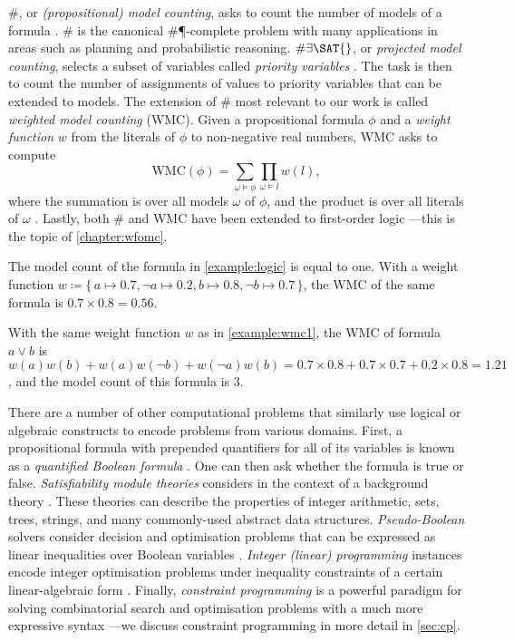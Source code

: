 \#\SAT{}, or \emph{(propositional) model counting}, asks to count the number of models of a formula \citep{DBLP:series/faia/GomesSS09}. \#\SAT{} is the canonical \#\P-complete problem with many applications in areas such as planning and probabilistic reasoning. $\#\exists\SAT{}$, or \emph{projected model counting}, selects a subset of variables called \emph{priority variables} \citep{DBLP:conf/sat/AzizCMS15}. The task is then to count the number of assignments of values to priority variables that can be extended to models. The extension of \#\SAT{} most relevant to our work is called \emph{weighted model counting} (WMC). Given a propositional formula $\phi$ and a \emph{weight function} $w$ from the literals of $\phi$ to non-negative real numbers, WMC asks to compute
\[
\mathrm{WMC}(\phi) = \sum_{\omega \models \phi} \prod_{\omega \models l} w(l),
\]
where the summation is over all models $\omega$ of $\phi$, and the product is over all literals of $\omega$ \citep{DBLP:journals/ai/ChaviraD08}. Lastly, both \#\SAT{} and WMC have been extended to first-order logic \citep{DBLP:conf/ijcai/BroeckTMDR11}---this is the topic of \cref{chapter:wfomc}.

\begin{example} \label{example:wmc1}
  The model count of the formula in \cref{example:logic} is equal to one. With a weight function $w \coloneqq \{\, a \mapsto 0.7, \neg a \mapsto 0.2, b \mapsto 0.8, \neg b \mapsto 0.7 \,\}$, the WMC of the same formula is $0.7 \times 0.8 = 0.56$.
\end{example}

\begin{example}
  With the same weight function $w$ as in \cref{example:wmc1}, the WMC of formula $a \lor b$ is $w(a)w(b) + w(a)w(\neg b) + w(\neg a)w(b) = 0.7 \times 0.8 + 0.7 \times 0.7 + 0.2 \times 0.8 = 1.21$, and the model count of this formula is 3.
\end{example}

There are a number of other computational problems that similarly use logical or algebraic constructs to encode problems from various domains. First, a propositional formula with prepended quantifiers for all of its variables is known as a \emph{quantified Boolean formula} \citep{DBLP:series/faia/BuningB09}. One can then ask whether the formula is true or false. \emph{Satisfiability module theories} considers \SAT{} in the context of a background theory \citep{DBLP:series/faia/BarrettSST09}. These theories can describe the properties of integer arithmetic, sets, trees, strings, and many commonly-used abstract data structures. \emph{Pseudo-Boolean} solvers consider decision and optimisation problems that can be expressed as linear inequalities over Boolean variables \citep{DBLP:series/faia/RousselM09}. \emph{Integer (linear) programming} instances encode integer optimisation problems under inequality constraints of a certain linear-algebraic form \citep{wolsey2020integer}. Finally, \emph{constraint programming} is a powerful paradigm for solving combinatorial search and optimisation problems with a much more expressive syntax \citep{DBLP:reference/fai/2}---we discuss constraint programming in more detail in \cref{sec:cp}.


